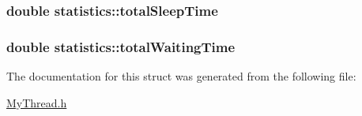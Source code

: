 \hypertarget{structstatistics_a1f0439010d53389154db4aeec91e23f2}{
\subsubsection[{total\+Sleep\+Time}]{\setlength{\rightskip}{0pt plus 5cm}double statistics\+::total\+Sleep\+Time}}\label{structstatistics_a1f0439010d53389154db4aeec91e23f2}
\hypertarget{structstatistics_ac1ba48e4a7f9f36f32da719f1beb6c44}{
\subsubsection[{total\+Waiting\+Time}]{\setlength{\rightskip}{0pt plus 5cm}double statistics\+::total\+Waiting\+Time}}\label{structstatistics_ac1ba48e4a7f9f36f32da719f1beb6c44}


The documentation for this struct was generated from the following file\+:\begin{DoxyCompactItemize}
\item 
\hyperlink{_my_thread_8h}{My\+Thread.\+h}\end{DoxyCompactItemize}
